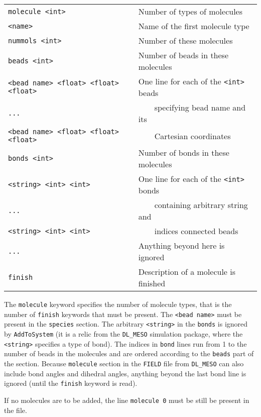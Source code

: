 \noindent
\begin{longtable}{ll}
  \texttt{molecule <int>} & Number of types of molecules \\
  \texttt{<name>} & Name of the first molecule type \\
  \texttt{nummols <int>} & Number of these molecules \\
  \texttt{beads <int>} & Number of beads in these molecules \\
  \texttt{<bead name> <float> <float> <float>} & One line for each of the \texttt{<int>} beads \\
  \texttt{...} & \ \ \ \ specifying bead name and its \\
  \texttt{<bead name> <float> <float> <float>} & \ \ \ \ Cartesian coordinates \\
  \texttt{bonds <int>} & Number of bonds in these molecules \\
  \texttt{<string> <int> <int>} & One line for each of the \texttt{<int>} bonds \\
  \texttt{...} & \ \ \ \ containing arbitrary string and \\
  \texttt{<string> <int> <int>} & \ \ \ \ indices connected beads \\
  \texttt{...} & Anything beyond here is ignored \\
  \texttt{finish} & Description of a molecule is finished \\
\end{longtable}

The \texttt{molecule} keyword specifies the number of molecule types, that
is the number of \texttt{finish} keywords that must be present. The
\texttt{<bead name>} must be present in the \texttt{species} section. The
arbitrary \texttt{<string>} in the \texttt{bonds} is ignored by
\texttt{AddToSystem} (it is a relic from the \texttt{DL\_MESO} simulation
package, where the \texttt{<string>} specifies a type of bond). The indices
in \texttt{bond} lines run from 1 to the number of beads in the molecules and are
ordered according to the \texttt{beads} part of the section. Because
\texttt{molecule} section in the \texttt{FIELD} file from \texttt{DL\_MESO}
can also include bond angles and dihedral angles, anything beyond the last
bond line is ignored (until the \texttt{finish} keyword is read).

If no molecules are to be added, the line \texttt{molecule 0} must be still
be present in the file.

